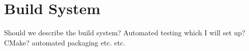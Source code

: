 \chapter{Build System}
Should we describe the build system? Automated testing which I will set up?
CMake? automated packaging etc. etc. 
